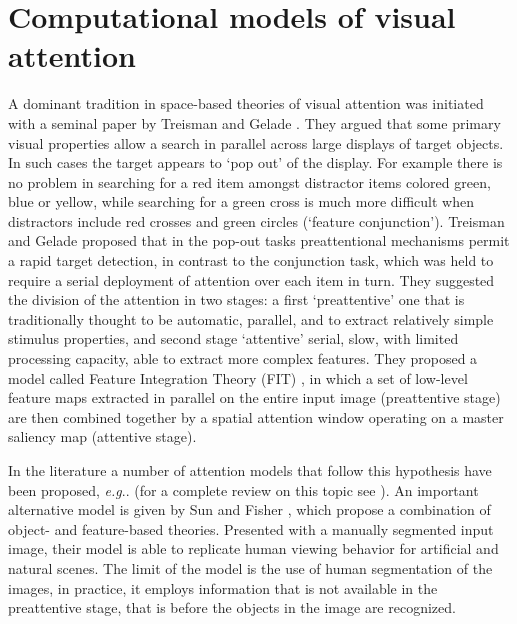 \documentclass{llncs}
\makeatletter
\DeclareRobustCommand\onedot{\futurelet\@let@token\@onedot}
\def\@onedot{\ifx\@let@token.\else.\null\fi\xspace}
\def\eg{\emph{e.g}\onedot} \def\Eg{\emph{E.g}\onedot}
\makeatother
\begin{document}
\section{Computational models of visual attention}
\label{sec:att_comp_models}
A dominant tradition in space-based theories of visual attention was initiated
with a seminal paper by Treisman and Gelade \cite{TreismanG80}. They argued
that some primary visual properties allow a search in parallel across large
displays of target objects. In such cases the target appears to `pop out' of
the display. For example there is no problem in searching for a red item
amongst distractor items colored green, blue or yellow, while searching for
a green cross is much more difficult when distractors include red crosses and
green circles (`feature conjunction').
Treisman and Gelade proposed that in the pop-out tasks preattentional mechanisms
permit a rapid target detection, in contrast to the conjunction task, which was held
to require a serial deployment of attention over each item in turn.
They suggested the division of the attention in two stages: 
a first `preattentive' one that is traditionally thought to be
automatic, parallel, and to extract relatively simple stimulus properties, and second stage
`attentive' serial, slow, with limited processing capacity, able to extract more complex features.
They proposed a model called Feature Integration Theory (FIT) \cite{TreismanG80},
in which a set of low-level feature maps extracted
in parallel on the entire input image (preattentive stage) are then combined
together by a spatial attention window operating on a
master saliency map (attentive stage).

In the literature a number of attention models that
follow this hypothesis have been proposed, \eg \cite{MilaneseGP95,IttiKN98}
(for a complete review on this topic see \cite{IttiK01}).
An important alternative model is
given by Sun and Fisher \cite{SunF03}, which propose a
combination of object- and feature-based theories. Presented
with a manually segmented input image, their model is able to
replicate human viewing behavior for artificial and natural
scenes. The limit of the model is the use of human segmentation of the images, 
in practice, it employs information that is not
available in the preattentive stage, that is before
the objects in the image are recognized.
\end{document}
